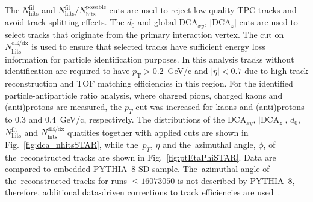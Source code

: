The $N_{\textrm{hits}}^{\textrm{fit}}$ and $N_{\textrm{hits}}^{\textrm{fit}}/N_{\textrm{hits}}^{\textrm{possible}}$ cuts are used to reject low quality TPC tracks and avoid track splitting effects. The $d_0$ and global $\textrm{DCA}_{xy}$,  $|\textrm{DCA}_{z}|$ cuts are used to select tracks that originate from the primary interaction vertex. The cut on $N_{\textrm{hits}}^{\textrm{dE/dx}}$ is used to ensure that selected tracks have sufficient energy loss information
for particle identification purposes. In this analysis tracks without identification are required to have $p_\textrm{T} > 0.2$~GeV/c and $|\eta| < 0.7$ due to high track reconstruction and TOF matching efficiencies in this region. For the identified particle-antiparticle ratio analysis, where charged pions, charged kaons and (anti)protons  are measured, the $p_T$ cut was increased for kaons and (anti)protons  to $0.3$ and $0.4$~GeV/c, respectively. 
The distributions of the $\textrm{DCA}_{xy}$, $|\textrm{DCA}_{z}|$, $d_0$, $N_{\textrm{hits}}^{\textrm{fit}}$ and $N_{\textrm{hits}}^{\textrm{dE/dx}}$ quatities together with applied cuts are shown in Fig.~\ref{fig:dca_nhitsSTAR}, while the~$p_T$, $\eta$ and  the~azimuthal angle, $\phi$, of the~reconstructed tracks are shown in Fig.~\ref{fig:ptEtaPhiSTAR}. Data are compared to embedded PYTHIA~8 SD sample. The~azimuthal angle of the~reconstructed tracks for runs $\leq 16073050$ is not described by PYTHIA~8, therefore, additional data-driven corrections to track efficiencies are used~\cite{supplementaryNote}.



